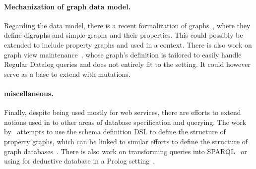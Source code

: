 \paragraph{Mechanization of graph data model.} Regarding the data model, there is a recent formalization of graphs~\cite{graphtheory}, where they define digraphs and simple graphs and their properties.
This could possibly be extended to include property graphs and used in a \gcoql context.
There is also work on graph view maintenance~\cite{graphviewmaint}, whose graph's definition is tailored to easily handle Regular Datalog queries and does not entirely fit to the \gql setting.
It could however serve as a base to extend \gcoql with mutations. 

\paragraph{\gql miscellaneous.} Finally, despite being used mostly for web services, there are efforts to extend notions used in \gql to other areas of database specification and querying. 
The work by~\cite{olafschema} attempts to use the schema definition DSL to define the structure of property graphs,
which can be linked to similar efforts to define the structure of graph databases~\cite{schemaval}. There is also work on transforming \gql queries into SPARQL~\cite{gqlsparql} or using \gql for deductive database in a Prolog setting~\cite{gqldeductive}. 

